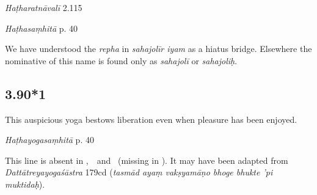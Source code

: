 \begin{ekdosis}
\begin{testimonia}[hp03_090]
\emph{Haṭharatnāvalī} 2.115
\begin{versinnote}
\end{versinnote}

\emph{Haṭhasaṃhitā} p. 40
\begin{versinnote}
\end{versinnote}
\end{testimonia}

\begin{philcomm}[hp03_090]
We have understood the \emph{repha} in \emph{sahajolīr iyam} as a hiatus bridge. Elsewhere the nominative of this name is found only as \emph{sahajolī} or \emph{sahajoliḥ}.
\end{philcomm}


\subsection*{3.90*1}
\begin{translation}[hp03_090_1]
This auspicious yoga bestows liberation even when pleasure has been enjoyed.
\end{translation}


\begin{testimonia}[hp03_090_1]
\emph{Haṭhayogasaṃhitā} p. 40
\begin{versinnote}
\end{versinnote}
\end{testimonia}

\begin{philcomm}[hp03_090_1]
This line is absent in \alphaTwo,\ \alphaThree\ and \gammaOne\ (missing in \alphaOne). It may have been adapted from \emph{Dattātreyayogaśāstra} 179cd (\emph{tasmād ayaṃ vakṣyamāṇo bhoge bhukte ’pi muktidaḥ}). 
\end{philcomm}



\end{ekdosis}
